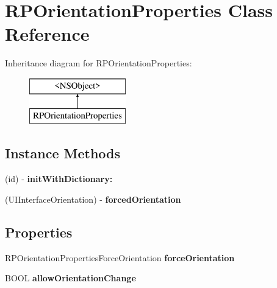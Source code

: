 \hypertarget{interface_r_p_orientation_properties}{\section{R\-P\-Orientation\-Properties Class Reference}
\label{interface_r_p_orientation_properties}
}
Inheritance diagram for R\-P\-Orientation\-Properties\-:\begin{figure}[H]
\begin{center}
\leavevmode
\includegraphics[height=2.000000cm]{interface_r_p_orientation_properties}
\end{center}
\end{figure}
\subsection*{Instance Methods}
\begin{DoxyCompactItemize}
\item 
\hypertarget{interface_r_p_orientation_properties_a619cca0e06027cc858c08901959fe72a}{(id) -\/ {\bfseries init\-With\-Dictionary\-:}}\label{interface_r_p_orientation_properties_a619cca0e06027cc858c08901959fe72a}

\item 
\hypertarget{interface_r_p_orientation_properties_ab48139145b987d06e7603697d3d5e414}{(U\-I\-Interface\-Orientation) -\/ {\bfseries forced\-Orientation}}\label{interface_r_p_orientation_properties_ab48139145b987d06e7603697d3d5e414}

\end{DoxyCompactItemize}
\subsection*{Properties}
\begin{DoxyCompactItemize}
\item 
\hypertarget{interface_r_p_orientation_properties_a074277343f7612f61c0153295121b0df}{R\-P\-Orientation\-Properties\-Force\-Orientation {\bfseries force\-Orientation}}\label{interface_r_p_orientation_properties_a074277343f7612f61c0153295121b0df}

\item 
\hypertarget{interface_r_p_orientation_properties_a72e8b41105752eb0e3c0e1ecaaa19bde}{B\-O\-O\-L {\bfseries allow\-Orientation\-Change}}\label{interface_r_p_orientation_properties_a72e8b41105752eb0e3c0e1ecaaa19bde}

\end{DoxyCompactItemize}
